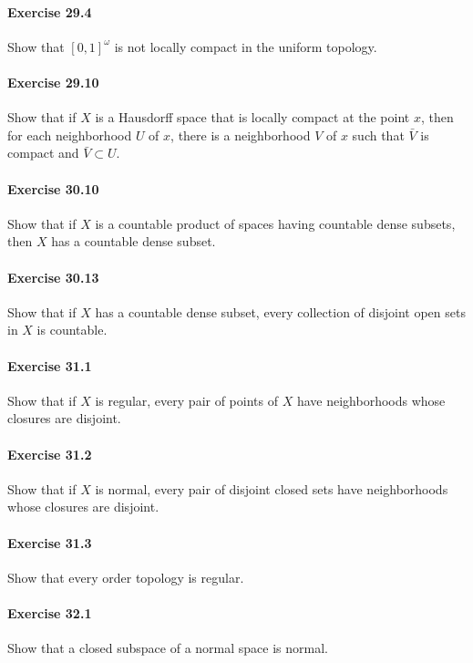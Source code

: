 \documentclass{article}
\begin{document}
\paragraph{Exercise 29.4} Show that $[0, 1]^\omega$ is not locally compact in the uniform topology.


\paragraph{Exercise 29.10} Show that if $X$ is a Hausdorff space that is locally compact at the point $x$, then for each neighborhood $U$ of $x$, there is a neighborhood $V$ of $x$ such that $\bar{V}$ is compact and $\bar{V} \subset U$.


\paragraph{Exercise 30.10} Show that if $X$ is a countable product of spaces having countable dense subsets, then $X$ has a countable dense subset.


\paragraph{Exercise 30.13} Show that if $X$ has a countable dense subset, every collection of disjoint open sets in $X$ is countable.


\paragraph{Exercise 31.1} Show that if $X$ is regular, every pair of points of $X$ have neighborhoods whose closures are disjoint.


\paragraph{Exercise 31.2} Show that if $X$ is normal, every pair of disjoint closed sets have neighborhoods whose closures are disjoint.


\paragraph{Exercise 31.3} Show that every order topology is regular.


\paragraph{Exercise 32.1} Show that a closed subspace of a normal space is normal.
\end{document}
